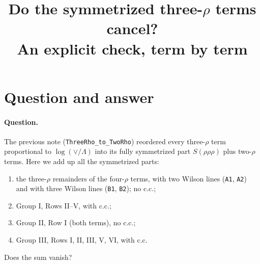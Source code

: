 \documentclass[10pt]{article}
\title{Do the symmetrized three-$\rho$ terms cancel?\\[2pt] \large An explicit check, term by term}
\date{}
\numberwithin{equation}{section}
\newcommand{\lab}[1]{\texttt{#1}}
\begin{document}
\maketitle
\tableofcontents

\section{Question and answer}\label{sec:answer}

\paragraph{Question.} The previous note (\texttt{ThreeRho\_to\_TwoRho}) reordered every three-$\rho$ term proportional to $\log(\vee/\Lambda)$ into its fully symmetrized part $S(\rho\rho\rho)$ plus two-$\rho$ terms. Here we add up all the symmetrized parts:
\begin{enumerate}
\item the three-$\rho$ remainders of the four-$\rho$ terms, with two Wilson lines (\lab{A1}, \lab{A2}) and with three Wilson lines (\lab{B1}, \lab{B2}); no c.c.;
\item Group I, Rows II--V, with c.c.;
\item Group II, Row I (both terms), no c.c.;
\item Group III, Rows I, II, III, V, VI, with c.c.
\end{enumerate}
Does the sum vanish?
\end{document}
